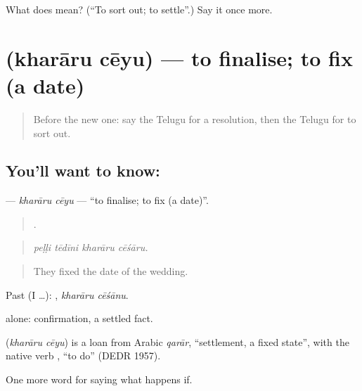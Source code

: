 \begin{tcolorbox}[breakable,colback=teal!4,colframe=teal!35!black,title={Before you move on}]
What does  mean? (\textquotedblleft{}To sort out; to settle\textquotedblright{}.) Say it once more.
\end{tcolorbox}
\section[\texorpdfstring{\te{ఖరారు} \te{చేయు} (kharāru cēyu)}{ఖరారు చేయు (kharāru cēyu)}]{  (kharāru cēyu) — to finalise; to fix (a date)}

\label{lesson:TE-C425-khararu-ceyu}



\begin{quote}
Before the new one: say the Telugu for a resolution, then the Telugu for to sort out.
\end{quote}

\subsection*{You'll want to know:  }
\textbf{ } — \emph{kharāru cēyu} — \textquotedblleft{}to finalise; to fix (a date)\textquotedblright{}.

\begin{quote}
   .
\end{quote}

\begin{quote}
\emph{peḷḷi tēdīni kharāru cēśāru.}
\end{quote}

\begin{quote}
They fixed the date of the wedding.
\end{quote}

Past (I …):  , \emph{kharāru cēśānu}.

 alone: confirmation, a settled fact.

\begin{cousinweb}
\textbf{ } (\emph{kharāru cēyu}) is a loan from Arabic \emph{qarār}, \textquotedblleft{}settlement, a fixed state\textquotedblright{}, with the native verb , \textquotedblleft{}to do\textquotedblright{} (DEDR 1957).
\end{cousinweb}

\begin{grammarlens}[title={What you've built}]
One more word for saying what happens if.
\end{grammarlens}

